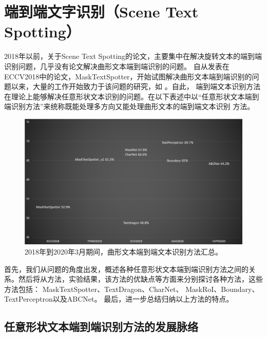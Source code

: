 % 
\chapter{端到端文字识别（Scene Text Spotting）}


2018年以前，关于Scene Text Spotting的论文\cite{liu2018fots}，主要集中在解决旋转文本的端到端识别问题，几乎没有论文解决曲形文本端到端识别的问题。
自从发表在ECCV2018中的论文，MaskTextSpotter\cite{lyu2018mask}，开始试图解决曲形文本端到端识别的问题以来，大量的工作开始致力于该问题的研究，如
\cite{lyu2018mask,liao2019mask,Feng_2019_ICCV,Xing_2019_ICCV,qin2019towards,wang2019all,liu2020abcnet,qiao2020text}。自此，
端到端文本识别方法在理论上能够解决任意形状文本识别的问题。在以下表述中以“任意形状文本端到端识别方法”来统称既能处理多方向又能处理曲形文本的端到端文本识别
方法。

\begin{figure}[H]
    \centering
    \includegraphics[width=.98\textwidth]{figure/spotting/trends.png} 
    \caption{2018年到2020年3月期间，曲形文本端到端文本识别方法汇总。} 
    \label{spotting_tends} 
\end{figure}

首先，我们从问题的角度出发，概述各种任意形状文本端到端识别方法之间的关系。然后将从方法，实验结果，该方法的优缺点等方面来分别探讨各种方法，这些方法包括：
MaskTextSpotter\cite{lyu2018mask,liao2019mask}、TextDragon\cite{Feng_2019_ICCV}、CharNet\cite{Xing_2019_ICCV}、
MaskRoI\cite{qin2019towards}、Boundary\cite{wang2019all}、TextPerceptron\cite{qiao2020text}以及ABCNet\cite{liu2020abcnet}。
最后，进一步总结归纳以上方法的特点。



\section{任意形状文本端到端识别方法的发展脉络}



